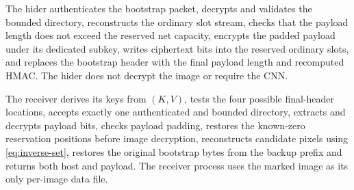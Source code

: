 \documentclass[preprint,12pt,a4paper]{elsarticle}
\begin{document}
The hider authenticates the bootstrap packet, decrypts and validates the bounded directory, reconstructs the ordinary slot stream, checks that the payload length does not exceed the reserved net capacity, encrypts the padded payload under its dedicated subkey, writes ciphertext bits into the reserved ordinary slots, and replaces the bootstrap header with the final payload length and recomputed HMAC. The hider does not decrypt the image or require the CNN.

The receiver derives its keys from $(K,V)$, tests the four possible final-header locations, accepts exactly one authenticated and bounded directory, extracts and decrypts payload bits, checks payload padding, restores the known-zero reservation positions before image decryption, reconstructs candidate pixels using \cref{eq:inverse-set}, restores the original bootstrap bytes from the backup prefix and returns both host and payload. The receiver process uses the marked image as its only per-image data file.
\end{document}
